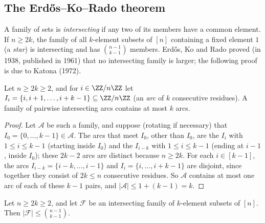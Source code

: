\subsection{The Erd\H{o}s--Ko--Rado theorem}\label{combinatorics:subsection-ekr}

A family of sets is \emph{intersecting} if any two of its members have a common element. If $n \geq 2k$, the family of all $k$-element subsets of $[n]$ containing a fixed element $1$ (a \emph{star}) is
intersecting and has $\binom{n-1}{k-1}$ members. Erd\H{o}s, Ko and Rado proved (in 1938, published in 1961) that no intersecting family is larger; the following proof is due to Katona (1972).

\begin{lemma}\label{combinatorics:lemma-katona-arcs}
Let $n \geq 2k \geq 2$, and for $i \in \ZZ/n\ZZ$ let $I_i = \{i, i + 1, \ldots, i + k - 1\} \subseteq \ZZ/n\ZZ$ (an \emph{arc} of $k$ consecutive residues). A family of pairwise intersecting arcs
contains at most $k$ arcs.
\end{lemma}

\begin{proof}
Let $\mathcal{A}$ be such a family, and suppose (rotating if necessary) that $I_0 = \{0, \ldots, k - 1\} \in \mathcal{A}$. The arcs that meet $I_0$, other than $I_0$, are the $I_i$ with
$1 \leq i \leq k - 1$ (starting inside $I_0$) and the $I_{i-k}$ with $1 \leq i \leq k - 1$ (ending at $i - 1$, inside $I_0$); these $2k - 2$ arcs are distinct because $n \geq 2k$. For each
$i \in [k - 1]$, the arcs $I_{i-k} = \{i - k, \ldots, i - 1\}$ and $I_i = \{i, \ldots, i + k - 1\}$ are disjoint, since together they consist of $2k \leq n$ consecutive residues. So $\mathcal{A}$ contains at
most one arc of each of these $k - 1$ pairs, and $|\mathcal{A}| \leq 1 + (k - 1) = k$.
\end{proof}

\begin{theorem}\label{combinatorics:theorem-ekr}
Let $n \geq 2k \geq 2$, and let $\mathcal{F}$ be an intersecting family of $k$-element subsets of $[n]$. Then $|\mathcal{F}| \leq \binom{n - 1}{k - 1}$.
\end{theorem}

